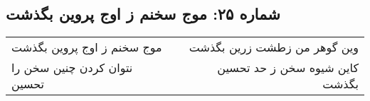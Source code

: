 \begin{center}
\section*{شماره ۲۵: موج سخنم ز اوج پروین بگذشت}
\label{sec:025}
\begin{longtable}{l p{0.5cm} r}
موج سخنم ز اوج پروین بگذشت
&&
وین گوهر من زطشت زرین بگذشت
\\
نتوان کردن چنین سخن را تحسین
&&
کاین شیوه سخن ز حد تحسین بگذشت
\\
\end{longtable}
\end{center}
